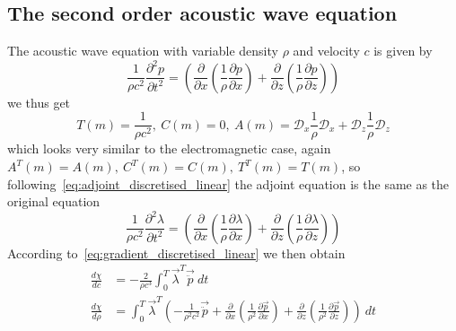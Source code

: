 \documentclass[fleqn,11pt]{SelfArx} %
\newcommand{\pder}[2][]{\frac{\partial#1}{\partial#2}}
\newcommand{\ppder}[2][]{\frac{\partial^2#1}{\partial#2^2}}
\theoremstyle{definition}
\begin{document}
\subsection{The second order acoustic wave equation}
The acoustic wave equation with variable density $\rho$ and velocity $c$ is given by
\begin{equation}\label{eq:second_order_acoustic}
\frac{1}{\rho c^2}\ppder[p]{t} = \left(\pder{x}\left(\frac{1}{\rho}\pder[p]{x}\right) + \pder{z}\left(\frac{1}{\rho}\pder[p]{z}\right) \right)
\end{equation}
we thus get 
\begin{equation}
T(m) = \frac{1}{\rho c^2}, \ C(m) = 0, \ A(m) = \mathcal{D}_x\frac{1}{\rho}\mathcal{D}_x + \mathcal{D}_z \frac{1}{\rho} \mathcal{D}_z
\end{equation}
which looks very similar to the electromagnetic case, again $A^T(m) = A(m), \ C^T(m) = C(m), \ T^T(m) = T(m) $, so following~\cref{eq:adjoint_discretised_linear} the adjoint equation is the same as the original equation
\begin{equation}
\frac{1}{\rho c^2}\ppder[\lambda]{t} = \left(\pder{x}\left(\frac{1}{\rho}\pder[\lambda]{x}\right) + \pder{z}\left(\frac{1}{\rho}\pder[\lambda]{z}\right) \right)
\end{equation}
According to~\cref{eq:gradient_discretised_linear} we then obtain
\begin{equation}
\begin{aligned}
\frac{d\chi}{dc} &=-\frac{2}{\rho c^3} \int_0^T\vec{\lambda}^T\vec{\ddot{p}} \ dt \\
\frac{d\chi}{d\rho} &= \int_0^T\vec{\lambda}^T\left(-\frac{1}{\rho^2 c^2} \vec{\ddot{p}} + \pder{x}\left(\frac{1}{\rho^2}\pder[\vec{p}]{x}\right) + \pder{z}\left(\frac{1}{\rho^2} \pder[\vec{p}]{z}\right)\right)\ dt \\
\end{aligned}
\end{equation}
\end{document}
